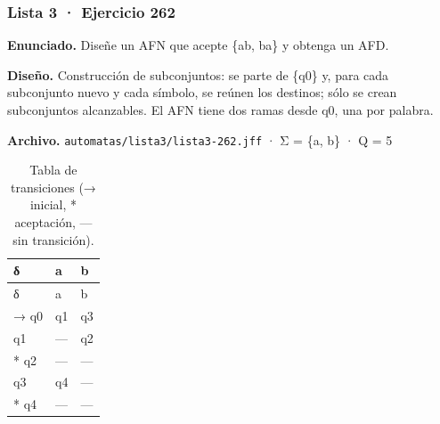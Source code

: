 
\hypertarget{lista-3-ejercicio-262}{%
\subsubsection{Lista 3 · Ejercicio 262}\label{lista-3-ejercicio-262}}

\textbf{Enunciado.} Diseñe un AFN que acepte \{ab, ba\} y obtenga un AFD.

\textbf{Diseño.} Construcción de subconjuntos: se parte de \{q0\} y, para cada subconjunto nuevo y cada símbolo, se reúnen los destinos; sólo se crean subconjuntos alcanzables. El AFN tiene dos ramas desde q0, una por palabra.

\textbf{Archivo.} \texttt{automatas/lista3/lista3-262.jff} · Σ = \{a, b\} · \textbar Q\textbar{} = 5

\begin{longtable}[]{@{}lll@{}}
\caption{Tabla de transiciones (→ inicial, * aceptación, --- sin transición).}\tabularnewline
\toprule\noalign{}
δ & a & b \\
\midrule\noalign{}
\endfirsthead
\toprule\noalign{}
δ & a & b \\
\midrule\noalign{}
\endhead
\bottomrule\noalign{}
\endlastfoot
→ q0 & q1 & q3 \\
q1 & --- & q2 \\
* q2 & --- & --- \\
q3 & q4 & --- \\
* q4 & --- & --- \\
\end{longtable}

